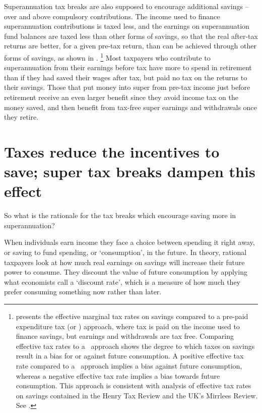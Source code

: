 Superannuation tax breaks are also supposed to encourage additional savings -- over and above compulsory contributions. The income used to finance superannuation contributions is taxed less, and the earnings on superannuation fund balances are taxed less than other forms of savings, so that the real after-tax returns are better, for a given pre-tax return, than can be achieved through other forms of savings, as shown in .%
%
\footnote{%
 presents the effective marginal tax rates on savings compared to a pre-paid expenditure tax (or \TEE) approach, where tax is paid on the income used to finance savings, but earnings and withdrawals are tax free. Comparing effective tax rates to a \TEE\ approach shows the degree to which taxes on savings result in a bias for or against future consumption. A positive effective tax rate compared to a \TEE\ approach implies a bias against future consumption, whereas a negative effective tax rate implies a bias towards future consumption. This approach is consistent with analysis of effective tax rates on savings contained in the Henry Tax Review and the UK’s Mirrlees Review. 
See \textcites{HenryTaxReview2010}{Wakefield2009}[][322]{MirrleesAdamBesleyEtAl2011}.%
}
%  
Most taxpayers who contribute to superannuation from their earnings before tax have more to spend in retirement than if they had saved their wages after tax, but paid no tax on the returns to their savings. Those that put money into super from pre-tax income just before retirement receive an even larger benefit since they avoid income tax on the money saved, and then benefit from tax-free super earnings and withdrawals once they retire.

\section{Taxes reduce the incentives to save; super tax breaks dampen this effect}\label{sec:SUPER-2-5}
So what is the rationale for the tax breaks which encourage saving more in superannuation? %

When individuals earn income they face a choice between spending it right away, or saving to fund spending, or ‘consumption’, in the future. In theory, rational taxpayers look at how much real earnings on savings will increase their future power to consume. They discount the value of future consumption by applying what economists call a ‘discount rate’, which is a measure of how much they prefer consuming something now rather than later. 

